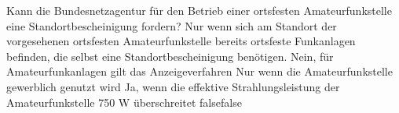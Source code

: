     {Kann die Bundesnetzagentur für den Betrieb einer ortsfesten Amateurfunkstelle eine Standortbescheinigung fordern?}
    {Nur wenn sich am Standort der vorgesehenen ortsfesten Amateurfunkstelle bereits ortsfeste Funkanlagen befinden, die selbst eine Standortbescheinigung benötigen.}
    {Nein, für Amateurfunkanlagen gilt das Anzeigeverfahren}
    {Nur wenn die Amateurfunkstelle gewerblich genutzt wird}
    {Ja, wenn die effektive Strahlungsleistung der Amateurfunkstelle 750 W überschreitet}
    {false}{false}